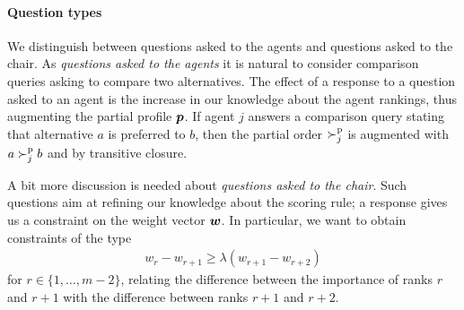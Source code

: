 \documentclass[sigconf, anonymous]{aamas}
\begin{document}
\paragraph{Question types}
We distinguish between questions asked to the agents and questions asked to the chair.
As {\em questions asked to the agents} it is natural to consider comparison queries asking to compare two alternatives.
The effect of a response to a question asked to an agent is the increase in our knowledge about the agent rankings, thus augmenting the partial profile ${\bm{p}}$. 
If agent $j$ answers a comparison query stating that alternative $a$ is preferred to $b$, then the partial order $\succ^\text{p}_j$ is augmented with $a \succ^\text{p}_j b$ and by transitive closure.

A bit more discussion is needed about {\em questions asked to the chair}.
Such questions aim at refining our knowledge about the scoring rule; a response gives us a constraint on the weight vector $\bm{w}$.
In particular, we want to obtain constraints of the type
\begin{align}
	w_{r} - w_{r+1} \geq \lambda (w_{r+1} - w_{r+2})
\end{align}
for $r \in \{1,\ldots,m-2\}$, relating the difference between the importance of ranks $r$ and $r+1$ with the difference between ranks $r+1$ and $r+2$.
\end{document}
